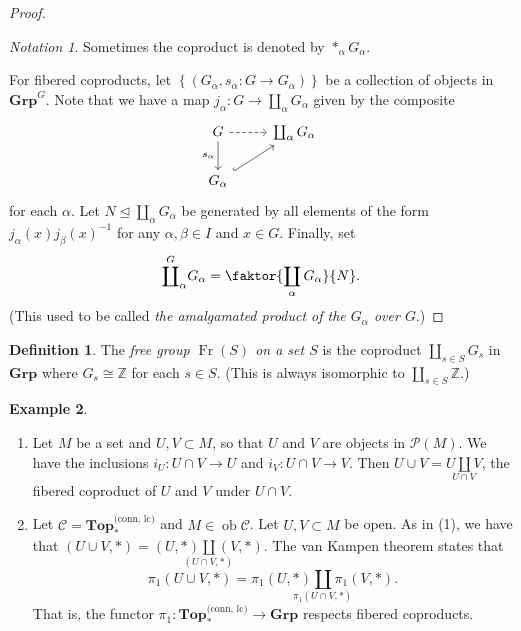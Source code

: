 \documentclass[10pt,letterpaper,cm]{nupset}
\theoremstyle{definition}
\newtheorem{definition}{Definition}[subsection]
\newtheorem{exmp}[definition]{Example}
\theoremstyle{theorem}
\theoremstyle{remark}
\newtheorem*{notation}{Notation}
\renewcommand{\P}{\mathcal P}
\newcommand{\Z}{\mathbb Z}
\newcommand{\1}{\mathbf{1}}
\renewcommand{\c}{\mathscr{C}}
\newcommand{\0}{\vec 0}
\DeclareMathOperator{\ob}{ob}
\DeclareMathOperator{\Fr}{Fr}
\begin{document}
\begin{proof}
\begin{notation}
Sometimes the coproduct is denoted by $\ast_{\alpha} G_{\alpha}$.
\end{notation}

\smallskip

 For fibered coproducts, let $\left\{\left(G_{\alpha}, s_{\alpha} : G \to G_{\alpha}\right)\right\}$ be a collection of objects in $\mathbf{Grp}^G$. Note that we have a map $j_{\alpha} : G \to \coprod_{\alpha} G_{\alpha}$ given by the composite
\[
\begin{tikzcd}
G \arrow[d, "s_{\alpha}"'] \arrow[r, dashed] & \coprod_{\alpha}G_{\alpha} \\
G_{\alpha} \arrow[ru, hook] & 
\end{tikzcd}
\] for each $\alpha$. Let $N \unlhd \coprod_{\alpha} G_{\alpha}$ be generated by all elements of the form $j_{\alpha}(x)j_{\beta}(x)^{-1}$ for any $\alpha, \beta \in I$ and $x\in G$.  Finally, set $$\overset{G}{\coprod}_{\alpha} G_{\alpha} = \faktor{\coprod_{\alpha} G_{\alpha}}{N}.$$ (This used to be called \textit{the amalgamated product of the $G_{\alpha}$ over $G$}.)
\end{proof}

\begin{definition}
The \textit{free group $\Fr(S)$ on a set $S$} is the coproduct $\coprod_{s\in S}G_{s}$ in $\mathbf{Grp}$ where $G_s\cong \Z$ for each $s\in S$. (This is always isomorphic to $\coprod_{s\in S}\Z$.)
\end{definition}

\begin{exmp} $ $
\begin{enumerate}[label=(\arabic*)]
\item Let $M$ be a set and $U, V\subset M$, so that $U$ and $V$ are objects in $\P(M)$. We have the inclusions $i_U : U \cap V \to U$ and $i_V : U \cap V \to V$. Then $U \cup V = \underset{U \cap V}{U \coprod V}$, the fibered coproduct of $U$ and $V$ under $U \cap V$.
\item Let $\c =  \mathbf{Top}_{\ast}^{\text{(conn, lc)}}$ and $M \in \ob \c$. Let $U, V \subset M$ be open. As in (1), we have that $\left(U \cup V, \ast\right)= \underset{(U \cap V, {\ast})}{(U, \ast)  \coprod (V, \ast)} $. The van Kampen theorem states that $$\pi_1(U \cup V, \ast) = \underset{\pi_1(U \cap V, \ast)}{\pi_1(U, \ast) \coprod \pi_1(V, \ast)}.$$ That is, the functor $\pi_1: \mathbf{Top}_{\ast}^{\text{(conn, lc)}}\to \mathbf{Grp}$ respects fibered coproducts. 
\end{enumerate}
\end{exmp}
\end{document}

